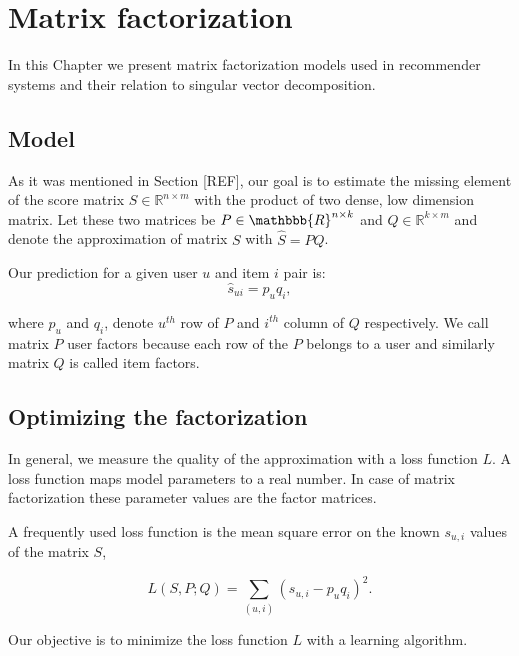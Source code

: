 \chapter{Matrix factorization}
In this Chapter we present matrix factorization models used in recommender systems 
and their relation to singular vector decomposition. 

\section{Model}

As it was mentioned in Section [REF], our goal is to estimate the missing element of the 
score matrix $S\in\mathbb{R}^{n\times m}$ with the product of two dense, low dimension 
matrix. Let these two matrices be $P\in\mathbbb{R}^{n\times k}$ and 
$Q\in\mathbb{R}^{k\times m}$ and denote the approximation of matrix $S$ with 
$\hat{S}=PQ$.

Our prediction for a given user $u$ and item $i$ pair is:
\[\hat{s}_{ui}=p_{u}q_{i},\]

where $p_u$ and $q_i$, denote $u^{th}$ row  of $P$ and  $i^{th}$ column of $Q$
respectively. We call matrix $P$ user factors because each row  of the $P$ belongs 
to a user and similarly matrix $Q$ is called item factors. 

\section{Optimizing the factorization}
In general, we measure the quality of the approximation with a loss function $L$. 
A loss function maps model parameters to a real number. In case of matrix factorization these 
parameter values are the factor matrices.

A frequently used loss function is the mean square error on the known $s_{u,i}$ values 
of the matrix $S$,

\[L(S,P;Q)=\sum_{(u,i)}(s_{u,i}-p_{u}q_{i})^2 .\]

Our objective is to minimize the loss function $L$ with a learning algorithm.

